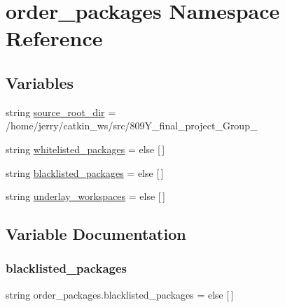 \hypertarget{namespaceorder__packages}{}\section{order\+\_\+packages Namespace Reference}
\label{namespaceorder__packages}
\subsection*{Variables}
\begin{DoxyCompactItemize}
\item 
string \hyperlink{namespaceorder__packages_aff4fd297841de7fbddc2c0c33a6bab21}{source\+\_\+root\+\_\+dir} = \textquotesingle{}/home/jerry/catkin\+\_\+ws/src/809\+Y\+\_\+final\+\_\+project\+\_\+\+Group\+\_\textquotesingle{}
\item 
string \hyperlink{namespaceorder__packages_a84450a73e77dbf3689293b97dcb697a4}{whitelisted\+\_\+packages} = \textquotesingle{}\textquotesingle{} else \mbox{[}$\,$\mbox{]}
\item 
string \hyperlink{namespaceorder__packages_a29ea913f00c5a0e81d3c7688e7375507}{blacklisted\+\_\+packages} = \textquotesingle{}\textquotesingle{} else \mbox{[}$\,$\mbox{]}
\item 
string \hyperlink{namespaceorder__packages_a11d102ff09fd2977b9075c4c722015d2}{underlay\+\_\+workspaces} = \textquotesingle{}\textquotesingle{} else \mbox{[}$\,$\mbox{]}
\end{DoxyCompactItemize}


\subsection{Variable Documentation}
\mbox{\label{namespaceorder__packages_a29ea913f00c5a0e81d3c7688e7375507}} 
\subsubsection{\texorpdfstring{blacklisted\+\_\+packages}{blacklisted\_packages}}
{\footnotesize\ttfamily string order\+\_\+packages.\+blacklisted\+\_\+packages = \textquotesingle{}\textquotesingle{} else \mbox{[}$\,$\mbox{]}}



